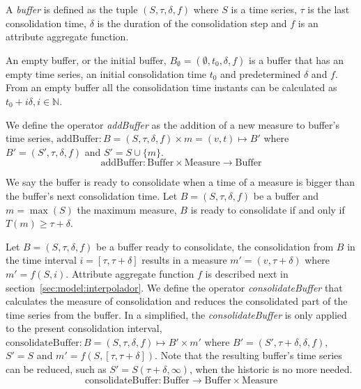 \begin{definition}[Buffer]
  A \emph{buffer} is defined as the tuple $(S,\tau,\delta,f)$ where
  $S$ is a time series, $\tau$ is the last consolidation time, $\delta$
  is the duration of the consolidation step and $f$ is an
  attribute aggregate function.
\end{definition}

An empty buffer, or the initial buffer, $B_{\emptyset} =
(\emptyset,t_0, \delta, f)$ is a buffer that has an empty time series,
an initial consolidation time $t_0$ and predetermined $\delta$ and $f$. From
an empty buffer all the consolidation time instants can be calculated
as $t_0+i\delta, i\in\mathbb{N}$.

We define the operator \emph{addBuffer} as the addition of a new
measure to buffer's time series, $\text{addBuffer}: B =
(S,\tau,\delta,f) \times m = (v,t) \mapsto B'$ where
$B'=(S',\tau,\delta,f)$ and $S' = S \cup \{m\} $.
\[
\text{addBuffer}: \text{Buffer} \times \text{Measure} \longrightarrow
\text{Buffer}
\]



We say the buffer is ready to consolidate when a time of a measure is
bigger than the buffer's next consolidation time.  Let
$B=(S,\tau,\delta,f)$ be a buffer and $m=\max(S)$ the maximum measure,
$B$ is ready to consolidate if and only if $T(m) \geq \tau+\delta$.



Let $B=(S,\tau,\delta,f)$ be a buffer ready to consolidate, the
consolidation from $B$ in the time interval $i=[\tau,\tau+\delta]$
results in a measure $m'=(v,\tau+\delta)$ where $m'=f(S,i)$. Attribute
aggregate function $f$ is described next in
section~\ref{sec:model:interpolador}.  We define the operator
\emph{consolidateBuffer} that calculates the measure of consolidation
and reduces the consolidated part of the time series from the
buffer. In a simplified, the \emph{consolidateBuffer} is only applied
to the present consolidation interval, $\text{consolidateBuffer}:
B=(S,\tau,\delta,f) \mapsto B' \times m' $ where $ B'=
(S',\tau+\delta,\delta,f)$, $ S' = S$ and $m' =
f(S,[\tau,\tau+\delta])$. Note that the resulting buffer's time series
can be reduced, such as $ S' = S(\tau+\delta,\infty)$, when the
historic is no more needed.
  \[
  \text{consolidateBuffer}: \text{Buffer} \longrightarrow \text{Buffer}
  \times \text{Measure}
  \]








